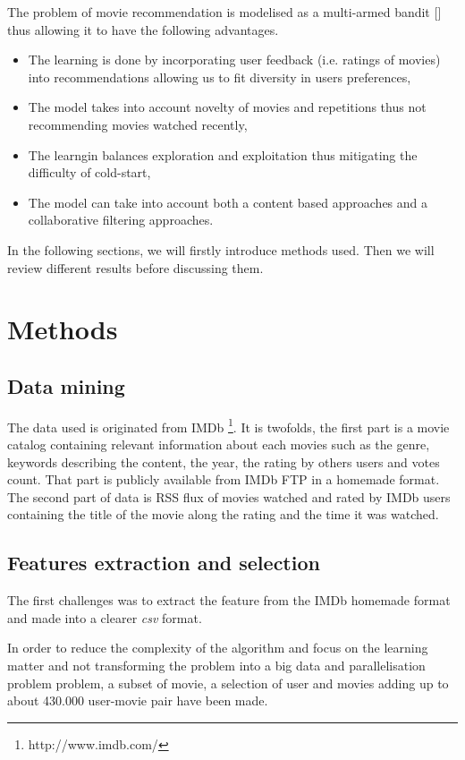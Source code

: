 \documentclass[letterpaper]{article}
\begin{document}
The problem of movie recommendation is modelised as a multi-armed bandit [\cite{sutton1998reinforcement}] thus allowing it to have the following advantages. 

\begin{itemize}
	\item The learning is done by incorporating user feedback (i.e. ratings of movies) into recommendations allowing us to fit diversity in users preferences,
	\item The model takes into account novelty of movies and repetitions thus not recommending movies watched recently,
	\item The learngin balances exploration and exploitation thus mitigating the difficulty of cold-start,
	\item The model can take into account both a content based approaches and a collaborative filtering approaches.
\end{itemize}


In the following sections, we will firstly introduce methods used. Then we will review different results before discussing them.

\section{Methods}

\subsection{Data mining}

The data used is originated from IMDb \footnote{http://www.imdb.com/}. It is twofolds, the first part is a movie catalog containing relevant information about each movies such as the genre, keywords describing the content, the year, the rating by others users and votes count. That part is publicly available from IMDb FTP in a homemade format. The second part of data is RSS flux of movies watched and rated by IMDb users containing the title of the movie along the rating and the time it was watched.

\subsection{Features extraction and selection}

The first challenges was to extract the feature from the IMDb homemade format and made into a clearer \textit{csv} format.

In order to reduce the complexity of the algorithm and focus on the learning matter and not transforming the problem into a big data and parallelisation problem problem, a subset of movie, a selection of user and movies adding up to about 430.000 user-movie pair have been made.
\end{document}
